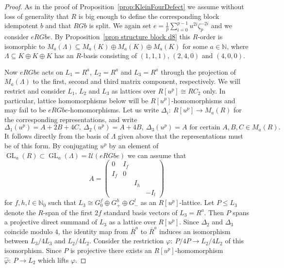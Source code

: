 \documentclass[11pt, a4paper]{amsart}
\theoremstyle{definition}
\theoremstyle{definition}
\newcommand{\N}{\mathbb N}
\newcommand{\GL}{\operatorname{GL}}
\renewcommand{\leq}{\leqslant}
\begin{document}
\begin{proof}
    As in the proof of Proposition~\ref{prop:KleinFourDefect} 
    we assume without loss of generality that $R$ is big enough to define the corresponding block idempotent $b$ and that $RGb$ is split. We again set $e=\frac{1}{p}\sum_{i=0}^{p-1} u^{2i}\zeta_p^{-2i}$ and we consider $eRGbe$. By Proposition~\ref{prop structure block d8} this $R$-order is isomorphic to $M_a(\Lambda)\subseteq M_a(K)\oplus M_a(K)\oplus M_a(K)$ for some $a\in \N$, where $\Lambda\subseteq K\oplus K \oplus K$ has an $R$-basis consisting of $(1,1,1)$, $(2,4,0)$ and $(4,0,0)$.

    Now $eRGbe$ acts on $L_1=R^a$, $L_2=R^a$ and $L_3=R^a$ through the projection of $M_a(\Lambda)$ to the first, second and third matrix component, respectively. We will restrict and consider $L_1$, $L_2$ and $L_3$ as lattices over $R[u^p]\cong RC_2$ only. In particular, lattice homomorphisms below will be $R[u^p]$-homomorphisms and may fail to be $eRGbe$-homomorphisms.
    Let us write $\Delta_i:\ R[u^p]\longrightarrow M_a(R)$ for the corresponding representations, and write 
    \begin{equation}
        \Delta_1(u^p) = A + 2B + 4C,\ \Delta_2(u^p)= A+4B, \ \Delta_3(u^p)=A \textrm{ for certain $A, B, C\in M_a(R)$}.
    \end{equation}
    It follows directly from the basis of $\Lambda$ given above that the representations must be of this form. By conjugating $u^p$ by an element of $\GL_a(R)\subset \GL_a(\Lambda)=\mathcal U(eRGbe)$ we can assume that
    \begin{equation}
        A=\left(\begin{array}{cccc} 0&I_f \\ I_f&0\\&&I_h \\&&&-I_l \end{array}\right)
    \end{equation}
    for $f,h,l\in \N_0$ such that $L_3 \cong G_0^f\oplus G_+^h \oplus G_-^l$ as an $R[u^p]$-lattice. Let $P\leq L_3$ denote the $R$-span of the first $2f$ standard basis vectors of $L_3=R^a$. Then $P$ spans a projective direct summand of $L_3$ as a lattice over $R[u^p]$. Since $\Delta_2$ and $\Delta_3$ coincide modulo $4$, the identity map from $\bar R^a$ to $\bar R^a$ induces an isomorphism between $L_3/4L_3$ and $L_2/4L_2$. Consider the restriction $\varphi: \ P/4P \longrightarrow L_2/4L_2$ of this isomorphism. Since $P$ is projective there exists an $R[u^p]$-homomorphism $\hat\varphi:\ P \longrightarrow L_2$ which lifts $\varphi$.  
    

\end{proof}
\end{document}
